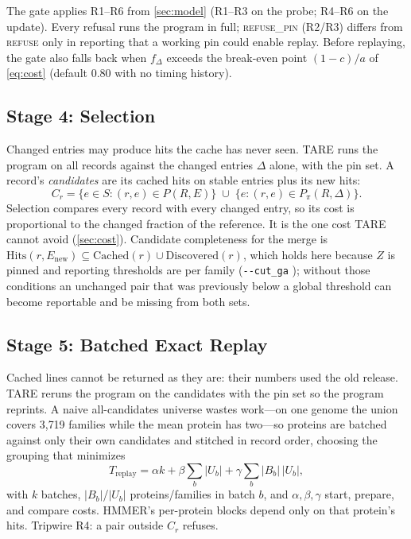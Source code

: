 \documentclass[letterpaper,twocolumn,10pt]{article}
\theoremstyle{definition}
\newcommand{\sys}{TARE\xspace}
\newcommand{\sys}{PARE\xspace}
\newcommand{\dec}[1]{\textsc{#1}}
\newcommand{\cutga}{\texttt{-{}-cut\_ga}\xspace}
\providecommand{\DIFadd}[1]{{\protect\color{blue} \sf #1}} %
\providecommand{\DIFaddbegin}{} %
\providecommand{\DIFaddend}{} %
\providecommand{\DIFaddincludegraphics}[2][]{{\color{blue}\fbox{\DIFOincludegraphics[#1]{#2}}}} %
\DeclareRobustCommand{\DIFaddbegin}{\DIFOaddbegin \let\includegraphics\DIFaddincludegraphics} %
\DeclareRobustCommand{\DIFaddend}{\DIFOaddend \let\includegraphics\DIFOincludegraphics} %
\begin{document}
The gate applies R1--R6 from \cref{sec:model} (R1--R3 on the probe; R4--R6 on the update). Every refusal runs the program
in full; \dec{refuse\_pin} (R2/R3) differs from \dec{refuse} only in reporting that a working pin could enable replay.
Before replaying, the gate also falls back when $f_\Delta$ exceeds the break\nobreakdash-even point $(1-c)/a$ of \cref{eq:cost}
(default 0.80 with no timing history).

\subsection{Stage 4: Selection}

Changed entries may produce hits the cache has never seen. \sys runs the program on all records against the changed
entries $\Delta$ alone, with the pin set. A record's \textit{candidates} are its cached hits on stable entries plus its
new hits:
\begin{equation}
C_r = \{e \in S : (r,e) \in P(R,E)\} \;\cup\; \{e : (r,e) \in P_\pi(R,\Delta)\}.
\label{eq:cand}
\end{equation}
Selection compares every record with every changed entry, so its cost is proportional to the changed fraction of the
reference. It is the one cost \sys cannot avoid (\cref{sec:cost}).
\DIFaddbegin \DIFadd{Candidate completeness for the merge is
$\mathrm{Hits}(r,E_{\mathrm{new}})\subseteq\mathrm{Cached}(r)\cup\mathrm{Discovered}(r)$, which holds here because $Z$ is pinned and
reporting thresholds are per family (}\cutga\DIFadd{); without those conditions an unchanged pair that was previously below a
global threshold can become reportable and be missing from both sets.
}\DIFaddend 

\subsection{Stage 5: Batched Exact Replay}
\label{sec:replay}

Cached lines cannot be returned as they are: their numbers used the old release. \sys reruns the program on the
candidates with the pin set so the program reprints. A naive all\nobreakdash-candidates universe wastes work---on one genome the
union covers 3{,}719 families while the mean protein has two---so proteins are batched against only their own
candidates and stitched in record order, choosing the grouping that minimizes
\begin{equation}
T_{\text{replay}} = \alpha k + \beta \sum_b |U_b| + \gamma \sum_b |B_b|\,|U_b|,
\label{eq:batch}
\end{equation}
with $k$ batches, $|B_b|$/$|U_b|$ proteins/families in batch $b$, and $\alpha,\beta,\gamma$ start, prepare, and
compare costs. HMMER's per\nobreakdash-protein blocks depend only on that protein's hits. Tripwire R4: a pair outside
$C_r$ refuses.
\end{document}
